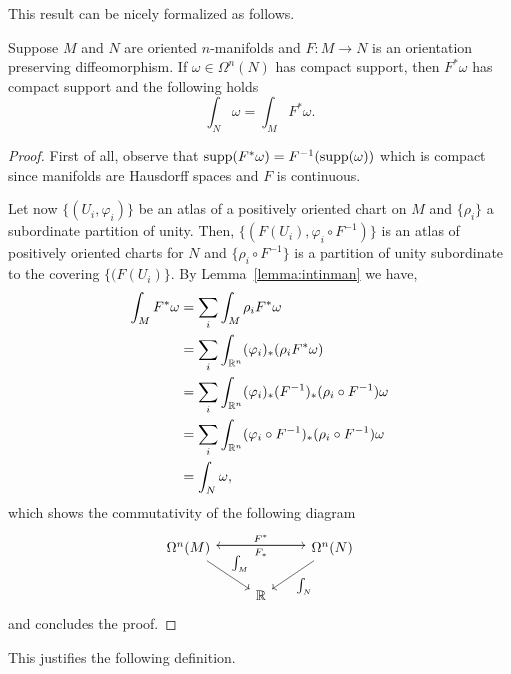 This result can be nicely formalized as follows.
\begin{theorem}
  Suppose $M$ and $N$ are oriented $n$-manifolds and $F:M\to N$ is an orientation preserving diffeomorphism.
  If $\omega\in\Omega^n(N)$ has compact support, then $F^*\omega$ has compact support and the following holds
  \begin{equation}
    \int_N \omega = \int_M F^* \omega.
  \end{equation}
\end{theorem}
\begin{proof}
  First of all, observe that $\operatorname{supp}(F^*\omega) = F^{-1}(\operatorname{supp}(\omega))$ which is compact since manifolds are Hausdorff spaces and $F$ is continuous.

  Let now $\{(U_i,\varphi_i)\}$ be an atlas of a positively oriented chart on $M$ and $\{\rho_i\}$ a subordinate partition of unity.
  Then, $\{(F(U_i),\varphi_i\circ F^{-1})\}$ is an atlas of positively oriented charts for $N$ and $\{\rho_i \circ F^{-1}\}$ is a partition of unity subordinate to the covering $\{(F(U_i)\}$.
  By Lemma~\ref{lemma:intinman} we have,
  \begin{align}
    \int_M F^*\omega &= \sum_i \int_M \rho_i F^*\omega \\
    &= \sum_i \int_{\mathbb{R}^n}(\varphi_i)_*(\rho_i F^*\omega)\\
    &= \sum_i \int_{\mathbb{R}^n}(\varphi_i)_*(F^{-1})_*(\rho_i \circ F^{-1}) \omega \\
    &= \sum_i \int_{\mathbb{R}^n}(\varphi_i \circ F^{-1})_*(\rho_i \circ F^{-1}) \omega \\
    &= \int_N\omega,
  \end{align}
  which shows the commutativity of the following diagram
  \begin{equation}
    \begin{tikzcd}
      \Omega^n(M) \arrow[rr, "F^*", yshift=0.5ex] \arrow[dr, "\int_M"] & & \Omega^n(N)\arrow[ll, "F_*", yshift=0.5ex] \arrow[dl, "\int_N"] \\
      & \R &
    \end{tikzcd}
  \end{equation}
  and concludes the proof.
\end{proof}

This justifies the following definition.

